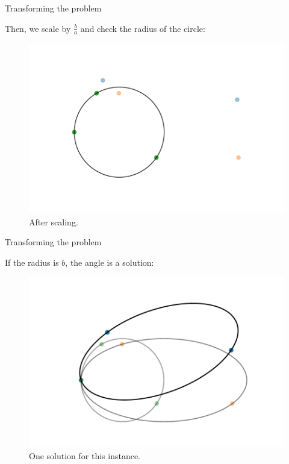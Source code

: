 \documentclass{beamer}
\begin{document}
\begin{frame}{Transforming the problem}
	
	Then, we scale by $\frac{b}{a}$ and check the radius of the circle:
	
	\begin{figure}
		\centering
		\includegraphics[scale=.5]{sol3}
		\caption{After scaling.}
		\label{fig:sol33}
	\end{figure}
\end{frame}

\begin{frame}{Transforming the problem}
	
	If the radius is $b$, the angle is a solution:
	
	\begin{figure}
		\centering
		\includegraphics[scale=.5]{sol4}
		\caption{One solution for this instance.}
		\label{fig:sol4}
	\end{figure}
\end{frame}
\end{document}
